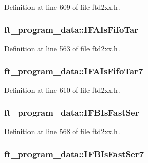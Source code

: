 Definition at line 609 of file ftd2xx.h.\hypertarget{structft__program__data_a906ada3748a6e9ba1ff4cac63e159e9d}{
\subsubsection[{IFAIsFifoTar}]{ {\bf ft\_\-program\_\-data::IFAIsFifoTar}}}
\label{structft__program__data_a906ada3748a6e9ba1ff4cac63e159e9d}


Definition at line 563 of file ftd2xx.h.\hypertarget{structft__program__data_ad144fd874019e32cb625bd42d1177a1b}{
\subsubsection[{IFAIsFifoTar7}]{ {\bf ft\_\-program\_\-data::IFAIsFifoTar7}}}
\label{structft__program__data_ad144fd874019e32cb625bd42d1177a1b}


Definition at line 610 of file ftd2xx.h.\hypertarget{structft__program__data_ad6220f0e81d216037ba11f65ec73bf4e}{
\subsubsection[{IFBIsFastSer}]{ {\bf ft\_\-program\_\-data::IFBIsFastSer}}}
\label{structft__program__data_ad6220f0e81d216037ba11f65ec73bf4e}


Definition at line 568 of file ftd2xx.h.\hypertarget{structft__program__data_a3515751d6639407ba0cd1097d477fbb5}{
\subsubsection[{IFBIsFastSer7}]{ {\bf ft\_\-program\_\-data::IFBIsFastSer7}}}
\label{structft__program__data_a3515751d6639407ba0cd1097d477fbb5}


